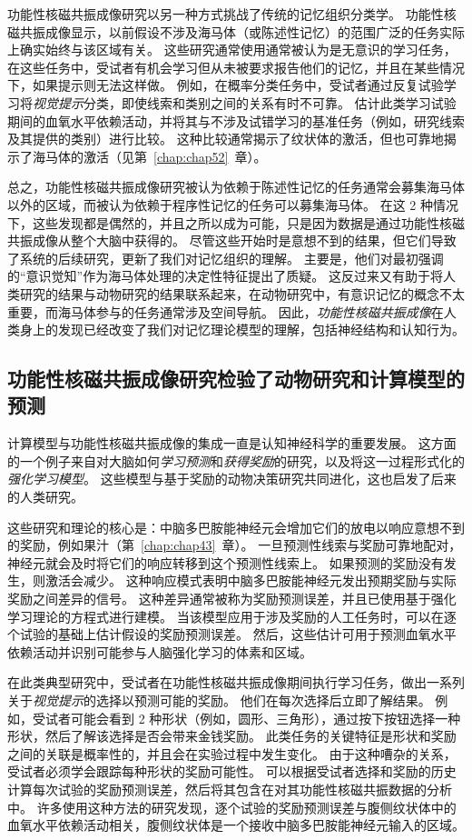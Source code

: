 功能性核磁共振成像研究以另一种方式挑战了传统的记忆组织分类学。
功能性核磁共振成像显示，以前假设不涉及海马体（或陈述性记忆）的范围广泛的任务实际上确实始终与该区域有关。
这些研究通常使用通常被认为是无意识的学习任务，在这些任务中，受试者有机会学习但从未被要求报告他们的记忆，并且在某些情况下，如果提示则无法这样做。
例如，在概率分类任务中，受试者通过反复试验学习将\textit{视觉提示}分类，即使线索和类别之间的关系有时不可靠。
估计此类学习试验期间的血氧水平依赖活动，并将其与不涉及试错学习的基准任务（例如，研究线索及其提供的类别）进行比较。
这种比较通常揭示了纹状体的激活，但也可靠地揭示了海马体的激活（见第~\ref{chap:chap52}~章）。


总之，功能性核磁共振成像研究被认为依赖于陈述性记忆的任务通常会募集海马体以外的区域，而被认为依赖于程序性记忆的任务可以募集海马体。
在这 2 种情况下，这些发现都是偶然的，并且之所以成为可能，只是因为数据是通过功能性核磁共振成像从整个大脑中获得的。
尽管这些开始时是意想不到的结果，但它们导致了系统的后续研究，更新了我们对记忆组织的理解。
主要是，他们对最初强调的“意识觉知”作为海马体处理的决定性特征提出了质疑。
这反过来又有助于将人类研究的结果与动物研究的结果联系起来，在动物研究中，有意识记忆的概念不太重要，而海马体参与的任务通常涉及空间导航。
因此，\textit{功能性核磁共振成像}在人类身上的发现已经改变了我们对记忆理论模型的理解，包括神经结构和认知行为。



\subsection{功能性核磁共振成像研究检验了动物研究和计算模型的预测}

计算模型与功能性核磁共振成像的集成一直是认知神经科学的重要发展。
这方面的一个例子来自对大脑如何\textit{学习预测}和\textit{获得奖励}的研究，以及将这一过程形式化的\textit{强化学习模型}。
这些模型与基于奖励的动物决策研究共同进化，这也启发了后来的人类研究。


这些研究和理论的核心是：中脑多巴胺能神经元会增加它们的放电以响应意想不到的奖励，例如果汁（第~\ref{chap:chap43}~章）。 
一旦预测性线索与奖励可靠地配对，神经元就会及时将它们的响应转移到这个预测性线索上。
如果预测的奖励没有发生，则激活会减少。
这种响应模式表明中脑多巴胺能神经元发出预期奖励与实际奖励之间差异的信号。
这种差异通常被称为奖励预测误差，并且已使用基于强化学习理论的方程式进行建模。
当该模型应用于涉及奖励的人工任务时，可以在逐个试验的基础上估计假设的奖励预测误差。
然后，这些估计可用于预测血氧水平依赖活动并识别可能参与人脑强化学习的体素和区域。


在此类典型研究中，受试者在功能性核磁共振成像期间执行学习任务，做出一系列关于\textit{视觉提示}的选择以预测可能的奖励。
他们在每次选择后立即了解结果。
例如，受试者可能会看到 2 种形状（例如，圆形、三角形），通过按下按钮选择一种形状，然后了解该选择是否会带来金钱奖励。
此类任务的关键特征是形状和奖励之间的关联是概率性的，并且会在实验过程中发生变化。
由于这种嘈杂的关系，受试者必须学会跟踪每种形状的奖励可能性。
可以根据受试者选择和奖励的历史计算每次试验的奖励预测误差，然后将其包含在对其功能性核磁共振数据的分析中。
许多使用这种方法的研究发现，逐个试验的奖励预测误差与腹侧纹状体中的血氧水平依赖活动相关，腹侧纹状体是一个接收中脑多巴胺能神经元输入的区域。


